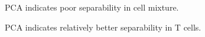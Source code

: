\documentclass[3p,authoryear,preprint,12pt]{elsarticle}
\makeatletter
\def\fixFloatSize#1{}%
\makeatother
\begin{document}
\bgroup
\fixFloatSize{img/mixPCA.png}
\begin{figure}[!htbp]
	\centering \makeatletter{}
	\makeatother 
	\caption{{PCA indicates poor separability in cell mixture.}}
	\label{f-c2b15a1baca9}
\end{figure}
\egroup
\bgroup
\fixFloatSize{img/TPCA.png}
\begin{figure}[!htbp]
	\centering \makeatletter{}
	\makeatother 
	\caption{{PCA indicates relatively better separability in T cells.}}
	\label{f-c2b15a1baca9}
\end{figure}
\end{document}
